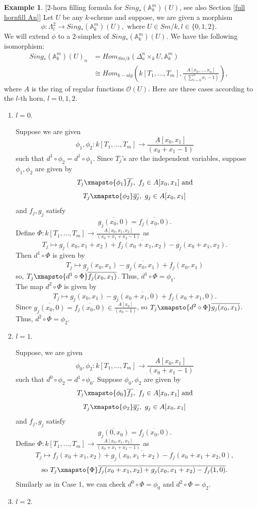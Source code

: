 \documentclass[11pt, reqno]{amsart}
\theoremstyle{plain}
\theoremstyle{definition}
\newtheorem{example}[thm]{Example}
\newcommand{\A}{{\mathbb A}}
\begin{document}
\begin{example}{[$2$-horn filling formula for $Sing_*(\A^m_k)(U)$, see also Section \ref{full hornfill An}]} \label{2 horn}
	Let $U$ be any $k$-scheme and
	suppose, we are given a morphism 
	$$\phi: \Lambda^2_l \to Sing_*(\mathbb{A}^m_k)(U), \text{ where } U \in Sm/k, l \in \{0, 1, 2\}.$$
	We will extend $\phi$ to a $2$-simplex of $Sing_*(\mathbb{A}^m_k)(U)$.
	We have the following isomorphism:
	\begin{align*}
		Sing_*(\mathbb{A}^m_k)(U)_n & = Hom_{Sm/k}(\Delta^n_a \times_k U, \mathbb{A}^m_k) \\
		& \cong Hom_{k-alg}(k[T_1,\dots, T_m], \frac{A[x_0,\dots, x_n]}{(\sum_{i=0}^n x_i - 1)}),
	\end{align*}
	where $A$ is the ring of regular functions $\mathcal{O}(U)$.
	Here are three cases according to the $l$-th horn, $l = 0,1,2$. \par
	\begin{enumerate}[start=1,label={\bfseries Case \arabic*:}]
		\item $l=0$.

 Suppose we are given
		$$\phi_1, \phi_2: k[T_1,\dots,T_m] \to \frac{A[x_0, x_1]}{(x_0 + x_1 - 1)}$$
		such that $d^1 \circ \phi_2 = d^1 \circ \phi_1$.  Since $T_j$'s are the independent variables, suppose $\phi_1, \phi_2$ are given by
		$$T_j \xmapsto{\phi_1} \overline{f_j}, \ f_j \in A[x_0, x_1] \text{ and}$$
		$$T_j \xmapsto{\phi_2} \overline{g_j}, \ g_j \in A[x_0, x_1]$$
		and $f_j, g_j$ satisfy
		$$\overline{g_j(x_0, 0)} = \overline{f_j(x_0, 0)}.$$
		Define $\Phi: k[T_1,\dots,T_m] \to \frac{A[x_0, x_1, x_2]}{(x_0 + x_1 +x_2-1)}$
		as 
		$$T_j \mapsto \overline{g_j(x_0, x_1+x_2) + f_j(x_0+x_1, x_2) - g_j(x_0 + x_1 , x_2) }.$$
		Then $d^1 \circ \Phi$ is given by 
		$$T_j \mapsto \overline{g_j(x_0, x_1) - g_j(x_0, x_1)+ f_j(x_0, x_1)}$$
		so, $T_j \xmapsto{d^1 \circ \Phi} \overline{f_j(x_0, x_1)}$. Thus, $d^1 \circ \Phi = \phi_1$. \\
		The map $d^2 \circ \Phi$ is given by
		$$T_j \mapsto \overline{g_j(x_0, x_1) - g_j(x_0+x_1, 0) + f_j(x_0+x_1, 0)}.$$
		Since $\overline{g_j(x_0, 0)} = \overline{f_j(x_0, 0)} \in \frac{A[x_0]}{(x_0 -1)}$, so $T_j \xmapsto{d^2 \circ \Phi} \overline{g_j(x_0, x_1)}$. Thus, $d^2 \circ \Phi = \phi_2$.
		\item $l = 1$.

		Suppose, we are given
		$$\phi_0, \phi_2: k[T_1,\dots,T_m] \to \frac{A[x_0, x_1]}{(x_0 + x_1 -1)}$$
		such that $d^0 \circ \phi_2 = d^1 \circ \phi_0$. Suppose $\phi_0, \phi_2$ are given by
		$$T_j \xmapsto{\phi_0} \overline{f_j}, \ f_j \in A[x_0, x_1] \text{ and}$$
		$$T_j \xmapsto{\phi_2} \overline{g_j}, \ g_j \in A[x_0, x_1]$$
		and $f_j, g_j$ satisfy
		$$\overline{g_j(0, x_0)} = \overline{f_j(x_0, 0)}.$$
		Define $\Phi: k[T_1,\dots,T_m] \to \frac{A[x_0, x_1, x_2]}{(x_0 + x_1 +x_2-1)}$
		as 
		$$T_j \mapsto \overline{f_j(x_0+ x_1,x_2) + g_j(x_0, x_1+ x_2) - f_j(x_0 + x_1+ x_2, 0) }, $$
		$$\text{so } T_j \xmapsto{\Phi} \overline{f_j(x_0+x_1, x_2) + g_j(x_0, x_1 + x_2) - f_j(1, 0) }.$$
		Similarly as in Case 1, we can check $d^0 \circ \Phi = \phi_0$ and $d^2 \circ \Phi = \phi_2$. 
		\item $l = 2$.


\end{enumerate}
\end{example}
\end{document}
